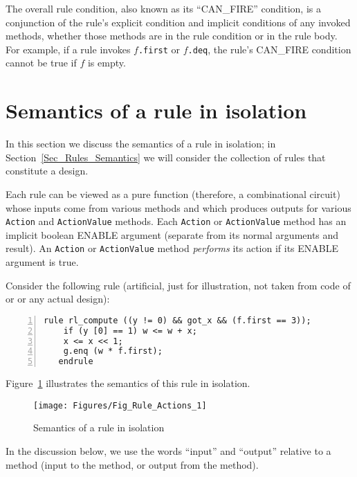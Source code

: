 
The overall rule condition, also known as its ``CAN\_FIRE'' condition,
is a conjunction of the rule's explicit condition and implicit
conditions of any invoked methods, whether those methods are in the
rule condition or in the rule body.  For example, if a rule invokes
$f$\verb|.first| or $f$\verb|.deq|, the rule's CAN\_FIRE condition
cannot be true if $f$ is empty.


\section{Semantics of a rule in isolation}

\label{Sec_Single_Rule_Semantics}


In this section we discuss the semantics of a rule in isolation; in
Section~\ref{Sec_Rules_Semantics} we will consider the collection of
rules that constitute a {\BSV} design.

Each rule can be viewed as a pure function (therefore, a combinational
circuit) whose inputs come from various methods and which produces
outputs for various \verb|Action| and \verb|ActionValue| methods.
Each \verb|Action| or \verb|ActionValue| method has an implicit
boolean ENABLE argument (separate from its normal arguments and
result).  An \verb|Action| or \verb|ActionValue| method
\emph{performs} its action if its ENABLE argument is true.

Consider the following rule (artificial, just for illustration, not
taken from code of {\DRUM} or {\FIFE} or any actual design):

{\footnotesize
\begin{Verbatim}[frame=single, numbers=left]
   rule rl_compute ((y != 0) && got_x && (f.first == 3));
    if (y [0] == 1) w <= w + x;
    x <= x << 1;
    g.enq (w * f.first);
   endrule
\end{Verbatim}
}

Figure~\ref{Fig_Rule_Actions_1} illustrates the semantics of this rule
in isolation.
\begin{figure}[htbp]
  \centerline{\texttt{[image: Figures/Fig\_Rule\_Actions\_1]}}
  \caption{\label{Fig_Rule_Actions_1} Semantics of a rule in isolation}
\end{figure}
In the discussion below, we use the words ``input'' and ``output''
relative to a method (input to the method, or output from the method).


